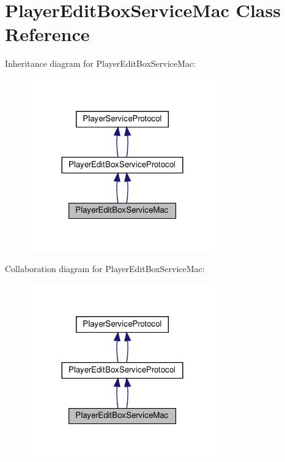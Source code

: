 \hypertarget{classPlayerEditBoxServiceMac}{}\section{Player\+Edit\+Box\+Service\+Mac Class Reference}
\label{classPlayerEditBoxServiceMac}


Inheritance diagram for Player\+Edit\+Box\+Service\+Mac\+:
\nopagebreak
\begin{figure}[H]
\begin{center}
\leavevmode
\includegraphics[width=228pt]{classPlayerEditBoxServiceMac__inherit__graph}
\end{center}
\end{figure}


Collaboration diagram for Player\+Edit\+Box\+Service\+Mac\+:
\nopagebreak
\begin{figure}[H]
\begin{center}
\leavevmode
\includegraphics[width=228pt]{classPlayerEditBoxServiceMac__coll__graph}
\end{center}
\end{figure}
